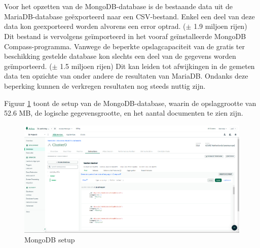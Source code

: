 \newpage




\section{}%
\label{sec:test-mongodb}

\subsection{}%
\label{subsec:creating-mongodb}

Voor het opzetten van de MongoDB-database is de bestaande data uit de MariaDB-database geëxporteerd naar een CSV-bestand. Enkel een deel van deze data kon geexporteerd worden alvorens een error optrad. ($\pm$ 1.9 miljoen rijen) Dit bestand is vervolgens geïmporteerd in het vooraf geïnstalleerde MongoDB Compass-programma. Vanwege de beperkte opslagcapaciteit van de gratis ter beschikking gestelde database kon slechts een deel van de gegevens worden geïmporteerd. ($\pm$ 1.5 miljoen rijen) Dit kan leiden tot afwijkingen in de gemeten data ten opzichte van onder andere de resultaten van MariaDB. Ondanks deze beperking kunnen de verkregen resultaten nog steeds nuttig zijn.

Figuur \ref{fig:mongodbsetup} toont de setup van de MongoDB-database, waarin de opslaggrootte van 52.6 MB, de logische gegevensgrootte, en het aantal documenten te zien zijn.

\begin{figure}[H]
    \centering
    \includegraphics[width=\linewidth]{graphics/mongodbsetup}
    \caption[MongoDB setup]{MongoDB setup}
    \label{fig:mongodbsetup}
\end{figure}

\newpage


